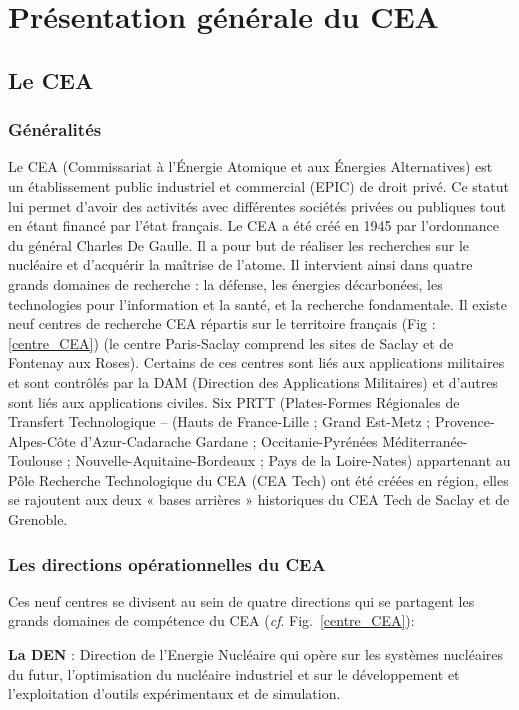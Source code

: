 \chapter{Présentation générale du CEA}

\section{Le CEA}
\subsection{Généralités}
Le CEA (Commissariat à l’\' Energie Atomique et aux \' Energies Alternatives) est un établissement public industriel et commercial (EPIC) de droit privé. Ce statut lui permet d’avoir des activités avec différentes sociétés privées ou publiques tout en étant financé par l’état français. 
Le CEA a été créé en 1945 par l’ordonnance du général Charles De Gaulle. Il a pour but de réaliser les recherches sur le nucléaire et d'acquérir la maîtrise de l'atome. Il intervient ainsi dans quatre grands domaines de recherche : la défense, les énergies décarbonées, les technologies pour l’information et la santé, et la recherche fondamentale.
Il existe neuf centres de recherche CEA répartis sur le territoire français (Fig :\ref{centre_CEA}) (le centre Paris-Saclay comprend les sites de Saclay et de Fontenay aux Roses). Certains de ces centres sont liés aux applications militaires et sont contrôlés par la DAM (Direction des Applications Militaires) et d’autres sont liés aux applications civiles. Six PRTT (Plates-Formes Régionales de Transfert Technologique – (Hauts de France-Lille ; Grand Est-Metz ; Provence-Alpes-Côte d’Azur-Cadarache Gardane ; Occitanie-Pyrénées Méditerranée-Toulouse ; Nouvelle-Aquitaine-Bordeaux ; Pays de la Loire-Nates) appartenant au Pôle Recherche Technologique du CEA (CEA Tech) ont été créées en région, elles se rajoutent aux deux « bases arrières » historiques du CEA Tech de Saclay et de Grenoble. 




\subsection{Les directions opérationnelles du CEA}


Ces neuf centres se divisent au sein de quatre directions qui se partagent les grands domaines de compétence du CEA (\textit{cf}. Fig.~\ref{centre_CEA}):

\textbf{La DEN} : Direction de l’Energie Nucléaire qui opère sur les systèmes nucléaires du futur, l’optimisation du nucléaire industriel et sur le développement et l’exploitation d’outils expérimentaux et de simulation.

